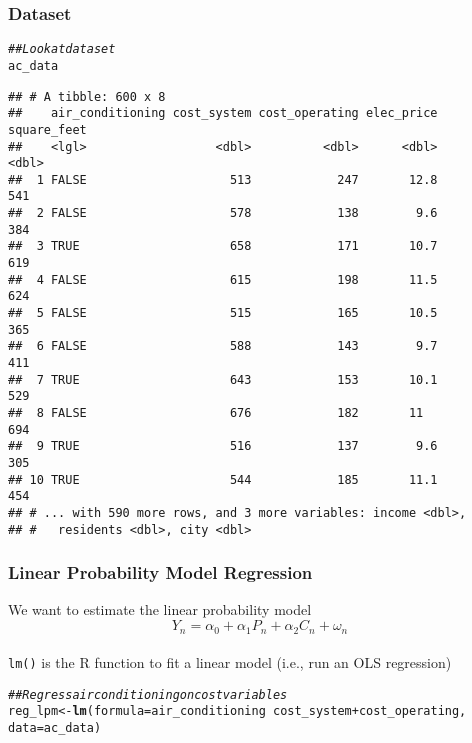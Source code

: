\documentclass{beamer}\usepackage[]{graphicx}\usepackage[]{color}
\makeatletter
\newcommand{\hlcom}[1]{\textcolor[rgb]{0.678,0.584,0.686}{\textit{#1}}}%
\newcommand{\hlopt}[1]{\textcolor[rgb]{0,0,0}{#1}}%
\newcommand{\hlstd}[1]{\textcolor[rgb]{0.345,0.345,0.345}{#1}}%
\newcommand{\hlkwb}[1]{\textcolor[rgb]{0.69,0.353,0.396}{#1}}%
\newcommand{\hlkwc}[1]{\textcolor[rgb]{0.333,0.667,0.333}{#1}}%
\newcommand{\hlkwd}[1]{\textcolor[rgb]{0.737,0.353,0.396}{\textbf{#1}}}%
\newenvironment{kframe}{%
 \def\at@end@of@kframe{}%
 \ifinner\ifhmode%
  \def\at@end@of@kframe{\end{minipage}}%
  \begin{minipage}{\columnwidth}%
 \fi\fi%
 \def\FrameCommand##1{\hskip\@totalleftmargin \hskip-\fboxsep
 \colorbox{shadecolor}{##1}\hskip-\fboxsep
     \hskip-\linewidth \hskip-\@totalleftmargin \hskip\columnwidth}%
 \MakeFramed {\advance\hsize-\width
   \@totalleftmargin\z@ \linewidth\hsize
   \@setminipage}}%
 {\par\unskip\endMakeFramed%
 \at@end@of@kframe}
\newenvironment{knitrout}{}{} %
\makeatother
\begin{document}
\begin{frame}[fragile]\frametitle{Dataset}
\begin{knitrout}\footnotesize
{}\color{fgcolor}\begin{kframe}
\begin{alltt}
\hlcom{## Look at dataset}
\hlstd{ac_data}
\end{alltt}
\begin{verbatim}
## # A tibble: 600 x 8
##    air_conditioning cost_system cost_operating elec_price square_feet
##    <lgl>                  <dbl>          <dbl>      <dbl>       <dbl>
##  1 FALSE                    513            247       12.8         541
##  2 FALSE                    578            138        9.6         384
##  3 TRUE                     658            171       10.7         619
##  4 FALSE                    615            198       11.5         624
##  5 FALSE                    515            165       10.5         365
##  6 FALSE                    588            143        9.7         411
##  7 TRUE                     643            153       10.1         529
##  8 FALSE                    676            182       11           694
##  9 TRUE                     516            137        9.6         305
## 10 TRUE                     544            185       11.1         454
## # ... with 590 more rows, and 3 more variables: income <dbl>,
## #   residents <dbl>, city <dbl>
\end{verbatim}
\end{kframe}
\end{knitrout}
\end{frame}

\begin{frame}[fragile]\frametitle{Linear Probability Model Regression}
    We want to estimate the linear probability model
    $$Y_n = \alpha_0 + \alpha_1 P_n + \alpha_2 C_n + \omega_n$$ \\
	  \vspace{3ex}
    \texttt{lm()} is the R function to fit a linear model (i.e., run an OLS regression)
\begin{knitrout}\footnotesize
{}\color{fgcolor}\begin{kframe}
\begin{alltt}
\hlcom{## Regress air conditioning on cost variables}
\hlstd{reg_lpm} \hlkwb{<-} \hlkwd{lm}\hlstd{(}\hlkwc{formula} \hlstd{= air_conditioning} \hlopt{~} \hlstd{cost_system} \hlopt{+} \hlstd{cost_operating,}
              \hlkwc{data} \hlstd{= ac_data)}
\end{alltt}
\end{kframe}
\end{knitrout}
\end{frame}
\end{document}
